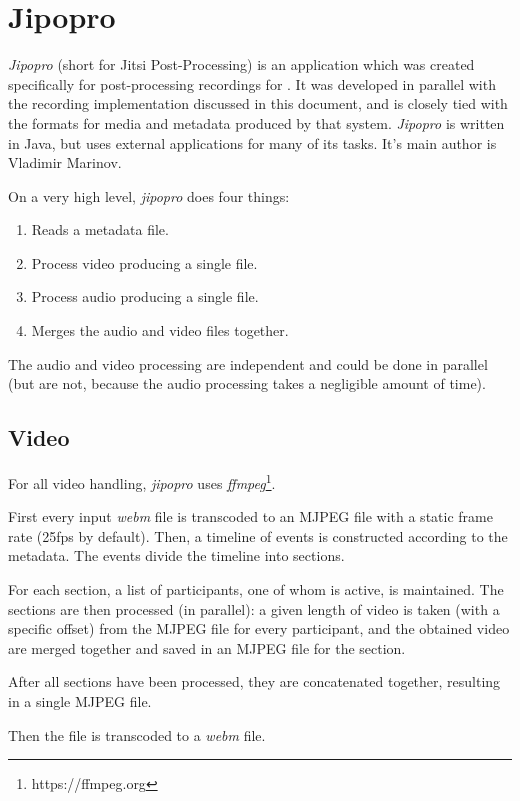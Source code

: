 \documentclass[twoside,openright,a4paper,12pt,english]{article}
\begin{document}
\clearpage
\appendix
\section{Jipopro}
\label{jipopro}
\emph{Jipopro} (short for Jitsi Post-Processing) is an application which was created
specifically for post-processing recordings for \jm. It was developed in parallel with
the recording implementation discussed in this document, and is closely tied
with the formats for media and metadata produced by that system. \emph{Jipopro}
is written in Java, but uses external applications for many of its tasks. It's
main author is Vladimir Marinov.

On a very high level, \emph{jipopro} does four things:
\begin{enumerate}
\item Reads a metadata file.
\item Process video producing a single file.
\item Process audio producing a single file.
\item Merges the audio and video files together.
\end{enumerate}

The audio and video processing are independent and could be done in parallel
(but are not, because the audio processing takes a negligible amount of time).


\subsection{Video}
For all video handling, \emph{jipopro} uses \emph{ffmpeg}\footnote{https://ffmpeg.org}.

First every input \emph{webm} file is transcoded to an MJPEG file with a static
frame rate (25fps by default). Then, a timeline of events is constructed
according to the metadata. The events divide the timeline into sections.

For each section, a list of participants, one of whom is active, is maintained.
The sections are then processed (in parallel): a given length of video is taken
(with a specific offset) from the MJPEG file for every participant, and the
obtained video are merged together and saved in an MJPEG file for the section.

After all sections have been processed, they are concatenated together, resulting in
a single MJPEG file.

Then the file is transcoded to a \emph{webm} file.
\end{document}
